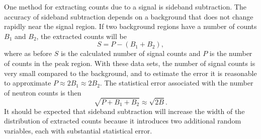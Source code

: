 One method for extracting counts due to a signal is sideband subtraction.  The accuracy of sideband subtraction depends on a background that does not change rapidly near the signal region.  If two background regions have a number of counts $B_1$ and $B_2$, the extracted counts will be
\begin{equation}
S = P - (B_1 + B_2),
\end{equation}
where as before $S$ is the calculated number of signal counts and $P$ is the number of counts in the peak region.  With these data sets, the number of signal counts is very small compared to the background, and to estimate the error it is reasonable to approximate $P \approx 2 B_1 \approx 2 B_2$.  The statistical error associated with the number of neutron counts is then
\begin{equation}
\sqrt{P + B_1 + B_2} \approx \sqrt{2 B}.
\end{equation}
It should be expected that sideband subtraction will increase the width of the distribution of extracted counts because it introduces two additional random variables, each with substantial statistical error.  

